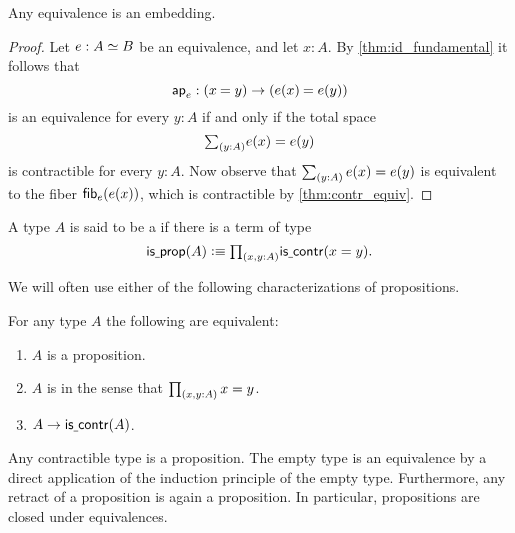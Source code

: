 \begin{prp}
\label{cor:emb_equiv} 
Any equivalence is an embedding.
\end{prp}

\begin{proof}
Let $e:\eqv{A}{B}$ be an equivalence, and let $x:A$. By \autoref{thm:id_fundamental} it follows that
\begin{equation*}
\apfunc{e} : (\id{x}{y})\to (\id{e(x)}{e(y)})
\end{equation*}
is an equivalence for every $y:A$ if and only if the total space
\begin{equation*}
\sm{y:A}e(x)=e(y)
\end{equation*}
is contractible for every $y:A$. Now observe that $\sm{y:A}e(x)=e(y)$ is equivalent to the fiber $\mathsf{fib}_{e}(e(x))$, which is contractible by \cref{thm:contr_equiv}.
\end{proof}

\begin{defn}
A type $A$ is said to be a  if there is a term of type
\begin{equation*}
\isprop(A)\defeq\prd{x,y:A}\iscontr(x=y).
\end{equation*}
\end{defn}

We will often use either of the following characterizations of propositions.

\begin{lem}\label{lem:prop_char}
For any type $A$ the following are equivalent:
\begin{enumerate}
\item $A$ is a proposition.
\item $A$ is  in the sense that $\prd{x,y:A}x=y$.
\item $A\to\mathsf{is\underline{\ }{}contr}(A)$. 
\end{enumerate}
\end{lem}

\begin{eg}\label{eg:prop_contr}
Any contractible type is a proposition. The empty type is an equivalence by a direct application of the induction principle of the empty type. Furthermore, any retract of a proposition is again a proposition. In particular, propositions are closed under equivalences.
\end{eg}

